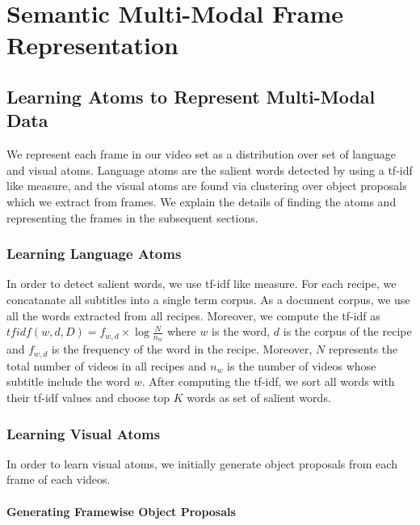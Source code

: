 \section{Semantic Multi-Modal Frame Representation}
\subsection{Learning Atoms to Represent Multi-Modal Data}
We represent each frame in our video set as a distribution over set of language and visual atoms. Language atoms are the salient words detected by using a tf-idf like measure, and the visual atoms are found via clustering over object proposals which we extract from frames. We explain the details of finding the atoms and representing the frames in the subsequent sections.
\subsubsection{Learning Language Atoms}
In order to detect salient words, we use tf-idf like measure. For each recipe, we concatanate all subtitles into a single term corpus. As a document corpus, we use all the words extracted from all recipes. Moreover, we compute the tf-idf as $tfidf(w,d,D)=f_{w,d} \times \log \frac{N}{n_{w}}$ where $w$ is the word, $d$ is the corpus of the recipe and $f_{w,d}$ is the frequency of the word in the recipe. Moreover, $N$ represents the total number of videos in all recipes and $n_{w}$ is the number of videos whose subtitle include the word $w$. After computing the tf-idf, we sort all words with their tf-idf values and choose top $K$ words as set of salient words.
\subsubsection{Learning Visual Atoms}
In order to learn visual atoms, we initially generate object proposals from each frame of each videos.
\paragraph{Generating Framewise Object Proposals}
